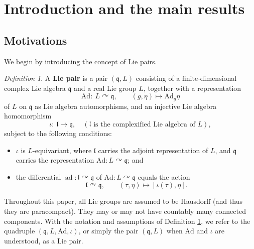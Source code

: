 \documentclass[12pt, a4paper]{amsart}
\newcommand{\Ad}{{\mathrm{Ad}}}
\newcommand{\ad}{\operatorname{ad}}
\newcommand{\q}{\mathfrak q}
\theoremstyle{Theorem}
\theoremstyle{Theorem}
\theoremstyle{Theorem}
\theoremstyle{Theorem}
\theoremstyle{Plain}
\theoremstyle{remark}
\theoremstyle{remark}
\theoremstyle{Definition}
\newtheorem{dfn}{Definition}[section]
\numberwithin{equation}{section}
\begin{document}
\maketitle

\tableofcontents

\section{Introduction and the main results}
\subsection{Motivations} 
 We begin by introducing the concept of Lie pairs.
\begin{dfn}\label{df:liepair}
	A \textbf{Lie pair} is a pair $(\mathfrak{q},L)$ consisting of a finite-dimensional complex Lie algebra $\mathfrak{q}$ and a real Lie group $L$, together with
	a   representation
	\[
	\Ad:\ L\curvearrowright \mathfrak{q}, \qquad (g,\eta )\mapsto \Ad_g \eta
	\]
	of $L$ on $\mathfrak{q}$ as Lie algebra automorphisms, and an injective Lie algebra homomorphism
	\[
	\iota:\ \mathfrak{l}\rightarrow \mathfrak{q}, \quad (\text{$\mathfrak{l}$ is the complexified Lie algebra of $L$}),
	\]
	subject to the following conditions:
	\begin{itemize}
		\item
		$\iota$ is $L$-equivariant, where $\mathfrak{l}$ carries the adjoint representation of $L$, and $\mathfrak{q}$ carries the representation $\Ad: L\curvearrowright\mathfrak{q}$; and
		\item
		the differential $\ad: \mathfrak{l}\curvearrowright \mathfrak{q}$ of $\Ad: L\curvearrowright \mathfrak{q}$ equals the action
		\[
		\mathfrak{l}\curvearrowright \mathfrak{q},\qquad (\tau,\eta)\mapsto [\iota(\tau),\eta].
		\]
	\end{itemize}
\end{dfn}
Throughout this paper, all Lie groups are assumed to be Hausdorff (and thus they are paracompact). They may or may not have countably many connected components. 
With the notation and assumptions of Definition \ref{df:liepair}, we refer to the quadruple $(\mathfrak{q}, L, \Ad, \iota)$, or simply the pair $(\mathfrak{q}, L)$ when $\Ad$ and $\iota$ are understood, as a Lie pair.
\end{document}
